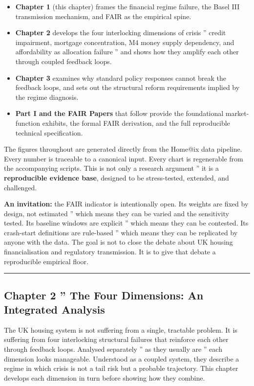 \documentclass[
]{article}
\providecommand{\tightlist}{%
  \setlength{\itemsep}{0pt}\setlength{\parskip}{0pt}}
\begin{document}
\begin{itemize}
\tightlist
\item
  \textbf{Chapter 1} (this chapter) frames the financial regime failure,
  the Basel III transmission mechanism, and FAIR as the empirical spine.
\item
  \textbf{Chapter 2} develops the four interlocking dimensions of crisis
  '' credit impairment, mortgage concentration, M4 money supply
  dependency, and affordability as allocation failure '' and shows how
  they amplify each other through coupled feedback loops.
\item
  \textbf{Chapter 3} examines why standard policy responses cannot break
  the feedback loops, and sets out the structural reform requirements
  implied by the regime diagnosis.
\item
  \textbf{Part I and the FAIR Papers} that follow provide the
  foundational market-function exhibits, the formal FAIR derivation, and
  the full reproducible technical specification.
\end{itemize}

The figures throughout are generated directly from the Home@ix data
pipeline. Every number is traceable to a canonical input. Every chart is
regenerable from the accompanying scripts. This is not only a research
argument '' it is a \textbf{reproducible evidence base}, designed to be
stress-tested, extended, and challenged.

\textbf{An invitation:} the FAIR indicator is intentionally open. Its
weights are fixed by design, not estimated '' which means they can be
varied and the sensitivity tested. Its baseline windows are explicit ''
which means they can be contested. Its crash-start definitions are
rule-based '' which means they can be replicated by anyone with the
data. The goal is not to close the debate about UK housing
financialisation and regulatory transmission. It is to give that debate
a reproducible empirical floor.

\begin{center}\rule{0.5\linewidth}{0.5pt}\end{center}

\protect{}\label{chapter-2}
\subsection{Chapter 2 '' The Four Dimensions: An Integrated
Analysis}\label{chapter-2-the-four-dimensions-an-integrated-analysis}

The UK housing system is not suffering from a single, tractable problem.
It is suffering from four interlocking structural failures that
reinforce each other through feedback loops. Analysed separately '' as
they usually are '' each dimension looks manageable. Understood as a
coupled system, they describe a regime in which crisis is not a tail
risk but a probable trajectory. This chapter develops each dimension in
turn before showing how they combine.
\end{document}
